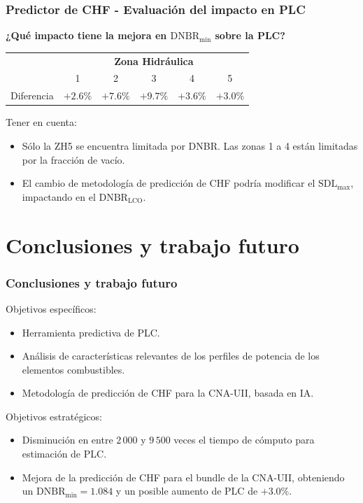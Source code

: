 \documentclass{beamer}
\begin{document}
\begin{frame}
    \frametitle{Predictor de CHF - Evaluación del impacto en PLC}
    \textbf{¿Qué impacto tiene la mejora en $\bm{\mathrm{DNBR}_\mathrm{min}}$ sobre la PLC?}



    \begin{table}[H]
        \centering
        \begin{tabular}{c c c c c c} 
            \toprule
                        & \multicolumn{5}{c}{\textbf{Zona Hidráulica}} \\
                        & 1         & 2         & 3         & 4         & 5         \\ \hline
            Diferencia  & $+2.6\%$  & $+7.6\%$ & $+9.7\%$ & $+3.6\%$ & $+3.0\%$ \\
            \bottomrule
        \end{tabular}
    \end{table}

    Tener en cuenta: 
    \begin{itemize}
        \item Sólo la ZH5 se encuentra limitada por DNBR. Las zonas 1 a 4 están limitadas por la fracción de vacío.
        \item El cambio de metodología de predicción de CHF podría modificar el $\mathrm{SDL}_\mathrm{max}$, impactando en el $\mathrm{DNBR}_\mathrm{LCO}$.
    \end{itemize}

\end{frame}

\section{Conclusiones y trabajo futuro}
\begin{frame}
    \frametitle{Conclusiones y trabajo futuro}
    Objetivos específicos:
    \begin{itemize}[label={\checkmark}]
        \item Herramienta predictiva de PLC.
        \item Análisis de características relevantes de los perfiles de potencia de los elementos combustibles.
        \item Metodología de predicción de CHF para la CNA-UII, basada en IA.
    \end{itemize}

    Objetivos estratégicos:
    \begin{itemize}[label={\checkmark}]
        \item Disminución en entre $2\,000$ y $9\,500$ veces el tiempo de cómputo para estimación de PLC.
        \item Mejora de la predicción de CHF para el bundle de la CNA-UII, obteniendo un $\mathrm{DNBR}_\mathrm{min} = 1.084$ y un posible aumento de PLC de $+3.0\%$.
    \end{itemize}
\end{frame}
\end{document}
